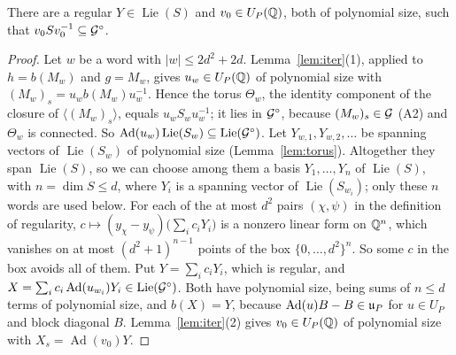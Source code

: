 \begin{lemma}\label{lem:v0}
There are a regular $Y\in\operatorname{Lie}(S)$ and $v_0\in U_P(\mathbb{Q})$, both of polynomial size, such that
$v_0Sv_0^{-1}\subseteq\mathcal{G}^\circ$.
\end{lemma}
\begin{proof}
Let $w$ be a word with $|w|\le2d^2+2d$. Lemma~\ref{lem:iter}(1), applied to $h=b(M_w)$ and $g=M_w$,
gives $u_w\in U_P(\mathbb{Q})$ of polynomial size with $(M_w)_s=u_wb(M_w)u_w^{-1}$. Hence the torus
$\Theta_w$, the identity component of the closure of $\langle(M_w)_s\rangle$, equals $u_wS_wu_w^{-1}$;
it lies in $\mathcal{G}^\circ$, because $(M_w)_s\in\mathcal{G}$ (A2) and $\Theta_w$ is connected. So
$\operatorname{Ad}(u_w)\operatorname{Lie}(S_w)\subseteq\operatorname{Lie}(\mathcal{G}^\circ)$. Let $Y_{w,1},Y_{w,2},\ldots$ be spanning vectors of
$\operatorname{Lie}(S_w)$ of polynomial size (Lemma~\ref{lem:torus}). Altogether they span $\operatorname{Lie}(S)$, so we can choose
among them a basis $Y_1,\ldots,Y_n$ of $\operatorname{Lie}(S)$, with $n=\dim S\le d$, where $Y_i$ is a spanning vector of
$\operatorname{Lie}(S_{w_i})$; only these $n$ words are used below. For each of the at most $d^2$ pairs $(\chi,\psi)$ in the definition of regularity,
$c\mapsto(y_\chi-y_\psi)\bigl(\sum_i c_iY_i\bigr)$ is a nonzero linear form on $\mathbb{Q}^n$, which
vanishes on at most $(d^2+1)^{n-1}$ points of the box $\{0,\ldots,d^2\}^n$. So some $c$ in the box
avoids all of them. Put $Y=\sum_ic_iY_i$, which is regular, and
$X=\sum_ic_i\operatorname{Ad}(u_{w_i})Y_i\in\operatorname{Lie}(\mathcal{G}^\circ)$. Both have polynomial size, being sums of $n\le d$ terms of
polynomial size, and $b(X)=Y$, because
$\operatorname{Ad}(u)B-B\in\mathfrak{u}_P$ for $u\in U_P$ and block diagonal $B$. Lemma~\ref{lem:iter}(2) gives
$v_0\in U_P(\mathbb{Q})$ of polynomial size with $X_s=\operatorname{Ad}(v_0)Y$.


\end{proof}

